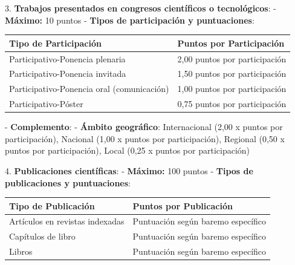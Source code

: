 \documentclass{article}
\begin{document}
\begin{itemize}
\begin{itemize}
                3. \textbf{Trabajos presentados en congresos científicos o tecnológicos}:
                - \textbf{Máximo:} 10 puntos
                - \textbf{Tipos de participación y puntuaciones}:
                \vspace{0.4cm}
                \begin{table}[h!]\centering\renewcommand{\arraystretch}{1.3}
                  \begin{tabular}{|p{}|p{}|}\hline
                    Tipo de Participación                      & Puntos por Participación      \\\hline
                    Participativo-Ponencia plenaria            & 2,00 puntos por participación \\\hline
                    Participativo-Ponencia invitada            & 1,50 puntos por participación \\\hline
                    Participativo-Ponencia oral (comunicación) & 1,00 puntos por participación \\\hline
                    Participativo-Póster                       & 0,75 puntos por participación \\\hline
                  \end{tabular}\end{table}
                \vspace{0.4cm}
                - \textbf{Complemento}:
                - \textbf{Ámbito geográfico}: Internacional (2,00 x puntos por participación), Nacional (1,00 x puntos por participación), Regional (0,50 x puntos por participación), Local (0,25 x puntos por participación)

                4. \textbf{Publicaciones científicas}:
                - \textbf{Máximo:} 100 puntos
                - \textbf{Tipos de publicaciones y puntuaciones}:
                \vspace{0.4cm}
                \begin{table}[h!]\centering\renewcommand{\arraystretch}{1.3}
                  \begin{tabular}{|p{}|p{}|}\hline
                    Tipo de Publicación             & Puntos por Publicación             \\\hline
                    Artículos en revistas indexadas & Puntuación según baremo específico \\\hline
                    Capítulos de libro              & Puntuación según baremo específico \\\hline
                    Libros                          & Puntuación según baremo específico \\\hline
                  \end{tabular}\end{table}
                \vspace{0.4cm}


\end{itemize}
\end{itemize}
\end{document}
